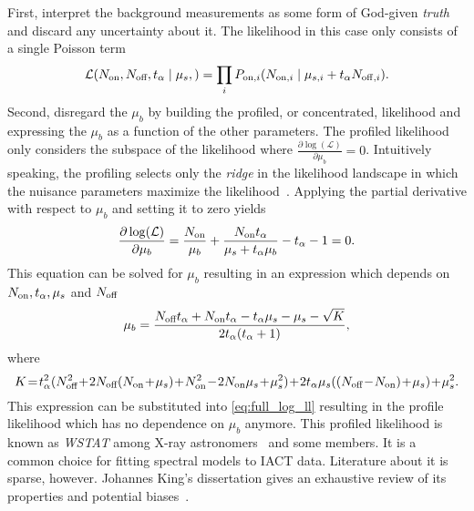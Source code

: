 First, interpret the background measurements as some form of God-given \emph{truth} and discard any uncertainty about it.
The likelihood in this case only consists of a single Poisson term
\begin{equation*}
  \operatorname{\mathcal{L}}\left( \Non, \Noff, \talpha \mid \mu_s, \right) =  \prod_i P_{\mathrm{on}, i}\left(N_{\mathrm{on}, i} \mid  \mu_{s, i} + \talpha N_{\mathrm{off}, i} \right).
\end{equation*}
Second, disregard the $\mu_b$ by building the profiled, or concentrated, likelihood and expressing the $\mu_b$  as a function of the other parameters.
The profiled likelihood only considers the subspace of the likelihood where $\frac{\partial \log(\mathcal{L})}{\partial \mu_b} = 0$.
Intuitively speaking, the profiling selects only the \emph{ridge} in the likelihood landscape in which the nuisance parameters maximize the likelihood~\cite[188]{profile_ll}.
Applying the partial derivative with respect to $\mu_b$ and setting it to zero yields 
\begin{equation}
  \label{eq:ll_profile}
  \frac{\partial \log(\mathcal{L})}{\partial \mu_b} =  \frac{N_\text{on}}{\mu_b} + \frac{N_\text{on} t_{\alpha}} {\mu_s + t_{\alpha} \mu_b} - t_{\alpha} - 1 = 0.
\end{equation}
This equation can be solved for $\mu_b$
resulting in an expression which depends on $N_\text{on}, t_{\alpha}, \mu_s$ and $N_\text{off}$
\begin{equation*}
  \mu_b =\frac{N_\text{off}t_{\alpha} + N_\text{on}t_{\alpha} - t_{\alpha}\mu_s - \mu_s - \sqrt{K}}{2t_{\alpha}(t_{\alpha} + 1)},
\end{equation*}
where
\begin{equation*}
  \medmuskip=1mu
  \thinmuskip=2mu
  \thickmuskip=2mu  
  K = \talpha^2 (\Noff^2 +  2 \Noff (\Non + \mu_s) + \Non^2 - 2 \Non \mu_s + \mu_s^2) + 2 \talpha \mu_s ((\Noff - \Non) + \mu_s) + \mu_s^2.
\end{equation*}
This expression can be substituted into \eqref{eq:full_log_ll} resulting in the profile likelihood which has no dependence on $\mu_b$ anymore.
This profiled likelihood is known as \emph{WSTAT} among X-ray astronomers~\cite{sherpa} and some \hess members. It is a common choice 
for fitting spectral models to IACT data. Literature about it is sparse, however.  
Johannes King's dissertation gives an exhaustive review of its properties and potential biases~\cite{king}.

